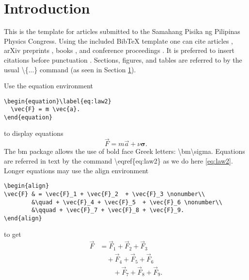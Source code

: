 \documentclass[10pt,a4paper,twoside]{article}
\begin{document}
\maketitle
\thispagestyle{titlestyle}


\section{Introduction}\label{sec:intro}
This is the template for articles submitted to the Samahang Pisika ng Pilipinas Physics Congress. Using the included BibTeX template one can cite articles \cite{articlekey}, arXiv preprints \cite{preprintkey}, books \cite{bookkey}, and conference proceedings \cite{proceedingskey,proceedingskey1,proceedingskey2}. It is preferred to insert citations before punctuation \cite{articlekey,preprintkey}. Sections, figures, and tables are referred to by the usual \textbackslash{}\{...\} command (as seen in Section \ref{sec:intro}).

Use the equation environment
\begin{verbatim}
\begin{equation}\label{eq:law2}
  \vec{F} = m \vec{a}.
\end{equation}	 
\end{verbatim}
to display equations
\begin{equation}\label{eq:law2}
		\vec{F} = m \vec{a} + \nu \bm\sigma.
\end{equation}
The {\ttfamily bm} package allows the use of bold face Greek letters: \textbackslash {\ttfamily bm}\textbackslash {\ttfamily sigma}. Equations are referred in text by the command \textbackslash{\ttfamily eqref}\{{\ttfamily eq:law2}\} as we do here \eqref{eq:law2}.
Longer equations may use the align environment
\begin{verbatim}
\begin{align}
\vec{F} & = \vec{F}_1 + \vec{F}_2  + \vec{F}_3 \nonumber\\
        &\quad + \vec{F}_4 + \vec{F}_5  + \vec{F}_6 \nonumber\\
        &\qquad + \vec{F}_7 + \vec{F}_8 + \vec{F}_9.
\end{align}
\end{verbatim}
to get
\begin{align}
\vec{F} & = \vec{F}_1 +  \vec{F}_2  +  \vec{F}_3  \nonumber \\
 &\quad + \vec{F}_4 +  \vec{F}_5  +  \vec{F}_6  \nonumber \\
 &\qquad + \vec{F}_7 + \vec{F}_8 + \vec{F}_9.
\end{align}
\end{document}
